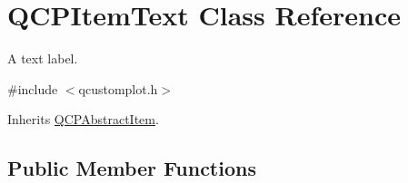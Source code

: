 \hypertarget{class_q_c_p_item_text}{\section{Q\-C\-P\-Item\-Text Class Reference}
\label{class_q_c_p_item_text}
}


A text label.  




{\ttfamily \#include $<$qcustomplot.\-h$>$}



Inherits \hyperlink{class_q_c_p_abstract_item}{Q\-C\-P\-Abstract\-Item}.

\subsection*{Public Member Functions}
